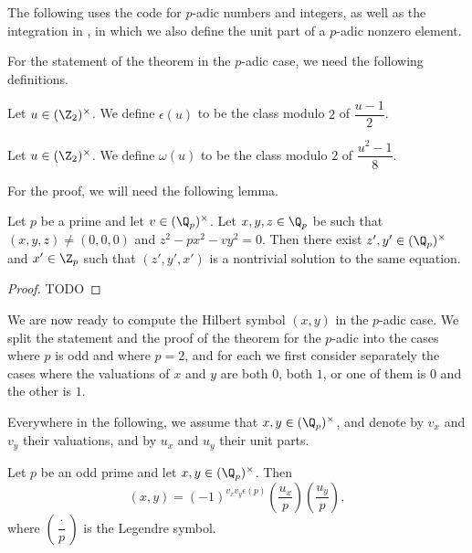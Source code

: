 The following uses the  code for $p$-adic numbers and integers, as well as the
integration in , in which we also define the unit part of a $p$-adic nonzero
element.


For the statement of the theorem in the $p$-adic case, we need the following definitions.


\begin{definition}
	\label{def:epsilon}
	\leanok
	Let $u \in (\Z_2)^\times$. We define $\epsilon(u)$ to be the class modulo $2$ of $\dfrac{u-1}{2}$.
\end{definition}

\begin{definition}
	\label{def:omega}
	\leanok
	Let $u \in (\Z_2)^\times$. We define $\omega(u)$ to be the class modulo $2$ of $\dfrac{u^2-1}{8}$.
\end{definition}



For the proof, we will need the following lemma.
\begin{lemma}
	\label{lem:nontrivialzero}
	\leanok
Let $p$ be a prime and let $v \in (\Q_p)^\times$. Let $x, y, z \in \Q_p$ be such that
$(x, y, z) \ne (0, 0, 0)$ and $z^2 - p x^2 - v y^2 = 0$. Then there exist
$z', y' \in (\Q_p)^\times$ and $x' \in \Z_p$ such that $(z', y', x')$ is a nontrivial solution to
the same equation.
\end{lemma}
\begin{proof}
	TODO
\end{proof}

We are now ready to compute the Hilbert symbol $(x,y)$ in the $p$-adic case.
We split the statement and the proof of the theorem for the $p$-adic into the cases where $p$ is odd
and where $p = 2$, and for each we first consider separately the cases where the valuations of $x$
and $y$ are both $0$, both $1$, or one of them is $0$ and the other is $1$.

Everywhere in the following, we assume that $x, y \in (\Q_p)^\times$, and denote by $v_x$ and $v_y$
their valuations, and by $u_x$ and $u_y$ their unit parts.

\begin{theorem}
	\label{thm:padic_odd_p}
	\leanok
Let $p$ be an odd prime and let $x,y \in (\Q_p)^\times$. Then
\[(x,y) = (-1)^{v_x v_y\epsilon(p)}\left(\dfrac{u_x}{p}\right) \left(\dfrac{u_y}{p}\right),\]
where $\left(\dfrac{\cdot}{p}\right)$ is the Legendre symbol.
\end{theorem}

